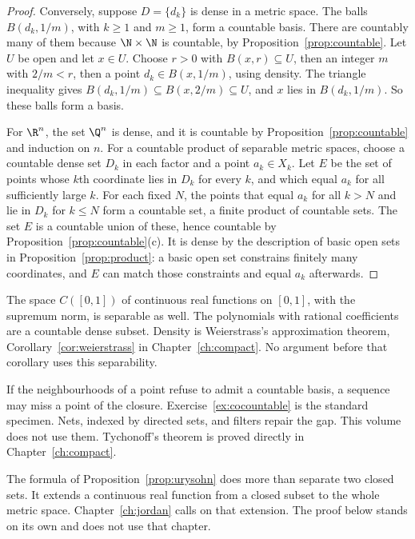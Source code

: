 \begin{proof}
Conversely, suppose $D=\{d_k\}$ is dense in a metric space. The balls $B(d_k,1/m)$, with $k\ge1$ and $m\ge1$, form a countable basis. There are countably many of them because $\N\times\N$ is countable, by Proposition~\ref{prop:countable}. Let $U$ be open and let $x\in U$. Choose $r>0$ with $B(x,r)\subseteq U$, then an integer $m$ with $2/m<r$, then a point $d_k\in B(x,1/m)$, using density. The triangle inequality gives $B(d_k,1/m)\subseteq B(x,2/m)\subseteq U$, and $x$ lies in $B(d_k,1/m)$. So these balls form a basis.

For $\R^n$, the set $\Q^n$ is dense, and it is countable by Proposition~\ref{prop:countable} and induction on $n$. For a countable product of separable metric spaces, choose a countable dense set $D_k$ in each factor and a point $a_k\in X_k$. Let $E$ be the set of points whose $k$th coordinate lies in $D_k$ for every $k$, and which equal $a_k$ for all sufficiently large $k$. For each fixed $N$, the points that equal $a_k$ for all $k>N$ and lie in $D_k$ for $k\le N$ form a countable set, a finite product of countable sets. The set $E$ is a countable union of these, hence countable by Proposition~\ref{prop:countable}(c). It is dense by the description of basic open sets in Proposition~\ref{prop:product}: a basic open set constrains finitely many coordinates, and $E$ can match those constraints and equal $a_k$ afterwards.
\end{proof}

The space $C([0,1])$ of continuous real functions on $[0,1]$, with the supremum norm, is separable as well. The polynomials with rational coefficients are a countable dense subset. Density is Weierstrass's approximation theorem, Corollary~\ref{cor:weierstrass} in Chapter~\ref{ch:compact}. No argument before that corollary uses this separability.

If the neighbourhoods of a point refuse to admit a countable basis, a sequence may miss a point of the closure. Exercise~\ref{ex:cocountable} is the standard specimen. Nets, indexed by directed sets, and filters repair the gap. This volume does not use them. Tychonoff's theorem is proved directly in Chapter~\ref{ch:compact}.

The formula of Proposition~\ref{prop:urysohn} does more than separate two closed sets. It extends a continuous real function from a closed subset to the whole metric space. Chapter~\ref{ch:jordan} calls on that extension. The proof below stands on its own and does not use that chapter.

